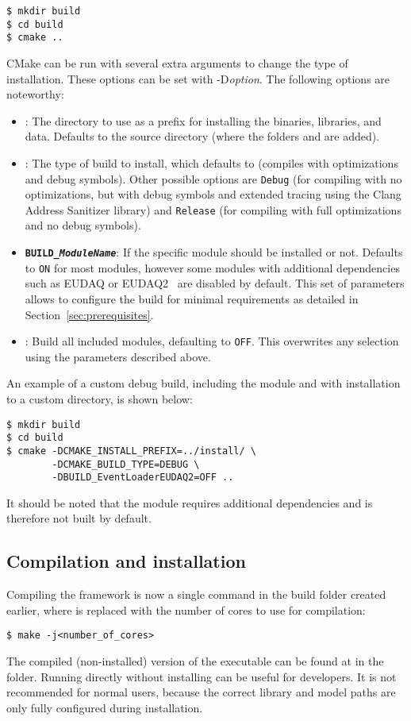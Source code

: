 \begin{verbatim}
$ mkdir build
$ cd build
$ cmake ..
\end{verbatim}

CMake can be run with several extra arguments to change the type of installation.
These options can be set with -D\textit{option}.
The following options are noteworthy:
\begin{itemize}
\item {}: The directory to use as a prefix for installing the binaries, libraries, and data.
Defaults to the source directory (where the folders  and  are added).
\item {}: The type of build to install, which defaults to  (compiles with optimizations and debug symbols).
Other possible options are \texttt{Debug} (for compiling with no optimizations, but with debug symbols and extended tracing using the Clang Address Sanitizer library) and \texttt{Release} (for compiling with full optimizations and no debug symbols).
\item \textbf{\texttt{BUILD\_\textit{ModuleName}}}: If the specific module  should be installed or not.
Defaults to \texttt{ON} for most modules, however some modules with additional dependencies such as EUDAQ or EUDAQ2~\cite{eudaq,eudaq2} are disabled by default.
This set of parameters allows to configure the build for minimal requirements as detailed in Section~\ref{sec:prerequisites}.
\item {}: Build all included modules, defaulting to \texttt{OFF}.
This overwrites any selection using the parameters described above.
\end{itemize}

An example of a custom debug build, including the  module and with installation to a custom directory, is shown below:
\begin{verbatim}
$ mkdir build
$ cd build
$ cmake -DCMAKE_INSTALL_PREFIX=../install/ \
        -DCMAKE_BUILD_TYPE=DEBUG \
        -DBUILD_EventLoaderEUDAQ2=OFF ..
\end{verbatim}
It should be noted that the  module requires additional dependencies and is therefore not built by default.

\subsection{Compilation and installation}
Compiling the framework is now a single command in the build folder created earlier, where  is replaced with the number of cores to use for compilation:
\begin{verbatim}
$ make -j<number_of_cores>
\end{verbatim}
The compiled (non-installed) version of the executable can be found at  in the  folder.
Running \corry directly without installing can be useful for developers.
It is not recommended for normal users, because the correct library and model paths are only fully configured during installation.


